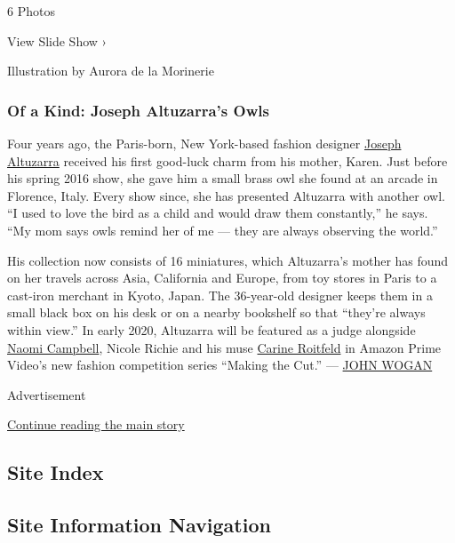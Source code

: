 6 Photos

View Slide Show ›

Illustration by Aurora de la Morinerie

\hypertarget{of-a-kind-joseph-altuzarras-owls-1}{%
\subsubsection{Of a Kind: Joseph Altuzarra's
Owls}\label{of-a-kind-joseph-altuzarras-owls-1}}

Four years ago, the Paris-born, New York-based fashion designer
\href{https://www.nytimes3xbfgragh.onion/2017/10/02/t-magazine/joseph-altuzarra-paris-fashion-week.html}{Joseph
Altuzarra} received his first good-luck charm from his mother, Karen.
Just before his spring 2016 show, she gave him a small brass owl she
found at an arcade in Florence, Italy. Every show since, she has
presented Altuzarra with another owl. ``I used to love the bird as a
child and would draw them constantly,'' he says. ``My mom says owls
remind her of me --- they are always observing the world.''

His collection now consists of 16 miniatures, which Altuzarra's mother
has found on her travels across Asia, California and Europe, from toy
stores in Paris to a cast-iron merchant in Kyoto, Japan. The 36-year-old
designer keeps them in a small black box on his desk or on a nearby
bookshelf so that ``they're always within view.'' In early 2020,
Altuzarra will be featured as a judge alongside
\href{https://www.nytimes3xbfgragh.onion/2016/09/07/t-magazine/fashion/naomi-campbell-vfiles-interview.html}{Naomi
Campbell}, Nicole Richie and his muse
\href{https://www.nytimes3xbfgragh.onion/2019/02/22/style/carine-roitfeld-perfume.html}{Carine
Roitfeld} in Amazon Prime Video's new fashion competition series
``Making the Cut.'' ---
\href{https://www.nytimes3xbfgragh.onion/by/john-wogan}{JOHN WOGAN}

Advertisement

\protect\hyperlink{after-bottom}{Continue reading the main story}

\hypertarget{site-index}{%
\subsection{Site Index}\label{site-index}}

\hypertarget{site-information-navigation}{%
\subsection{Site Information
Navigation}\label{site-information-navigation}}

